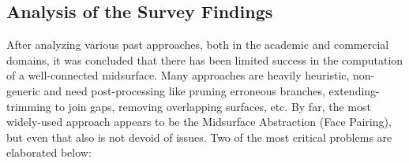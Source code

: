 
\subsection{Analysis of the Survey Findings}
 
 After analyzing various past approaches, both in the academic and commercial domains, it was concluded that there has been limited success in the computation of a well-connected midsurface. Many approaches are heavily heuristic, non-generic and need post-processing like pruning erroneous branches, extending-trimming to join gaps, removing overlapping surfaces, etc.  By far, the most widely-used approach appears to be the Midsurface Abstraction (Face Pairing), but even that also is not devoid of issues.  Two of the most critical problems are elaborated below:
	

